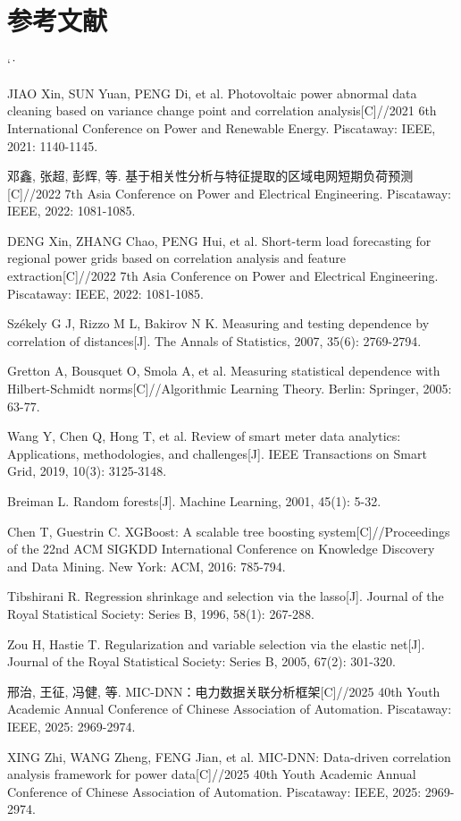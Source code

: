 \documentclass[UTF8,zihao=5,twoside]{ctexart}
\makeatletter
\numberwithin{equation}{section}
\renewcommand{\refname}{参考文献}
\renewenvironment{thebibliography}[1]{%
  \section*{\refname}%
  \small
  \list{[\arabic{enumi}]}{%
    \settowidth\labelwidth{[#1]}%
    \leftmargin\labelwidth
    \advance\leftmargin\labelsep
    \usecounter{enumi}}
  \sloppy\clubpenalty4000\widowpenalty4000\sfcode`\.\ \@m
}{\def\@noitemerr{\@latex@warning{Empty `thebibliography' environment}}\endlist}
\makeatother
\begin{document}
\begin{thebibliography}{99}
JIAO Xin, SUN Yuan, PENG Di, et al. Photovoltaic power abnormal data cleaning based on variance change point and correlation analysis[C]//2021 6th International Conference on Power and Renewable Energy. Piscataway: IEEE, 2021: 1140-1145.

邓鑫, 张超, 彭辉, 等. 基于相关性分析与特征提取的区域电网短期负荷预测[C]//2022 7th Asia Conference on Power and Electrical Engineering. Piscataway: IEEE, 2022: 1081-1085.

DENG Xin, ZHANG Chao, PENG Hui, et al. Short-term load forecasting for regional power grids based on correlation analysis and feature extraction[C]//2022 7th Asia Conference on Power and Electrical Engineering. Piscataway: IEEE, 2022: 1081-1085.

Székely G J, Rizzo M L, Bakirov N K. Measuring and testing dependence by correlation of distances[J]. The Annals of Statistics, 2007, 35(6): 2769-2794.

Gretton A, Bousquet O, Smola A, et al. Measuring statistical dependence with Hilbert-Schmidt norms[C]//Algorithmic Learning Theory. Berlin: Springer, 2005: 63-77.

Wang Y, Chen Q, Hong T, et al. Review of smart meter data analytics: Applications, methodologies, and challenges[J]. IEEE Transactions on Smart Grid, 2019, 10(3): 3125-3148.

Breiman L. Random forests[J]. Machine Learning, 2001, 45(1): 5-32.

Chen T, Guestrin C. XGBoost: A scalable tree boosting system[C]//Proceedings of the 22nd ACM SIGKDD International Conference on Knowledge Discovery and Data Mining. New York: ACM, 2016: 785-794.

Tibshirani R. Regression shrinkage and selection via the lasso[J]. Journal of the Royal Statistical Society: Series B, 1996, 58(1): 267-288.

Zou H, Hastie T. Regularization and variable selection via the elastic net[J]. Journal of the Royal Statistical Society: Series B, 2005, 67(2): 301-320.

邢治, 王征, 冯健, 等. MIC-DNN：电力数据关联分析框架[C]//2025 40th Youth Academic Annual Conference of Chinese Association of Automation. Piscataway: IEEE, 2025: 2969-2974.

XING Zhi, WANG Zheng, FENG Jian, et al. MIC-DNN: Data-driven correlation analysis framework for power data[C]//2025 40th Youth Academic Annual Conference of Chinese Association of Automation. Piscataway: IEEE, 2025: 2969-2974.


\end{thebibliography}
\end{document}
